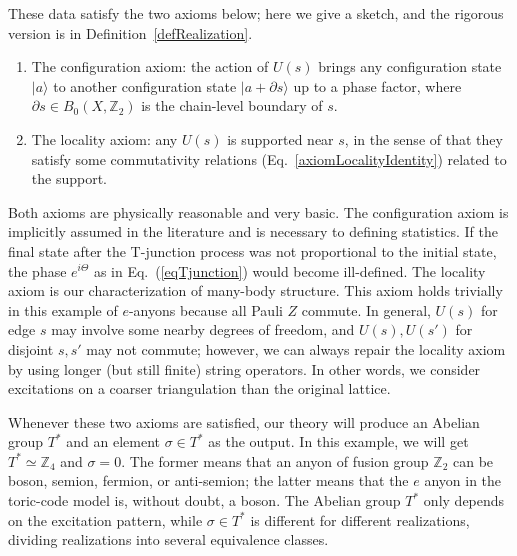 \documentclass[reprint, amsmath, amssymb, showpacs, floatfix, longbibliography, aps, twocolumn, superscriptaddress, nofootinbib]{revtex4-2}
\newcommand{\ZZ}{{\mathbb Z}}
\theoremstyle{definition}
\begin{document}
These data satisfy the two axioms below; here we give a sketch, and the rigorous version is in Definition~\ref{defRealization}.
\begin{enumerate}
	\item The configuration axiom: the action of $U(s)$ brings any configuration state $|a\rangle$ to another configuration state $|a+\partial s\rangle$ up to a phase factor, where $\partial s\in B_0(X,\ZZ_2)$ is the chain-level boundary of $s$.
	\item The locality axiom: any $U(s)$ is supported near $s$, in the sense of that they satisfy some commutativity relations (Eq.~\eqref{axiomLocalityIdentity}) related to the support.
\end{enumerate}

Both axioms are physically reasonable and very basic. The configuration axiom is implicitly assumed in the literature and is necessary to defining statistics. If the final state after the T-junction process was not proportional to the initial state, the phase $e^{i\Theta}$ as in Eq.~(\ref{eqTjunction}) would become ill-defined.
  The locality axiom is our characterization of many-body structure. This axiom holds trivially in this example of $e$-anyons because all Pauli $Z$ commute. In general, $U(s)$ for edge $s$ may involve some nearby degrees of freedom, and $U(s),U(s')$ for disjoint $s,s'$ may not commute; however, we can always repair the locality axiom by using longer (but still finite) string operators. In other words, we consider excitations on a coarser triangulation than the original lattice.

Whenever these two axioms are satisfied, our theory will produce an Abelian group $T^*$ and an element $\sigma\in T^*$ as the output. In this example, we will get $T^*\simeq \ZZ_4$ and $\sigma=0$. The former means that an anyon of fusion group $\ZZ_2$ can be boson, semion, fermion, or anti-semion; the latter means that the $e$ anyon in the toric-code model is, without doubt, a boson. The Abelian group $T^*$ only depends on the excitation pattern, while $\sigma\in T^*$ is different for different realizations, dividing realizations into several equivalence classes.
\end{document}
